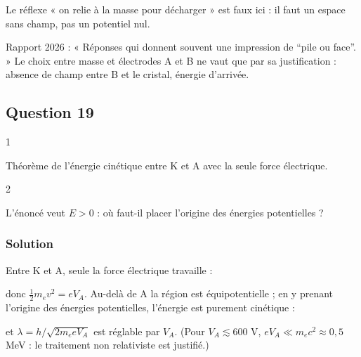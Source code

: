 \documentclass[11pt,a4paper]{article}
\newcommand{\equationajustee}[1]{%
  \sbox{\boiteequation}{$\displaystyle #1$}%
  \ifdim\wd\boiteequation>\linewidth
    \[\resizebox{\linewidth}{!}{\usebox{\boiteequation}}\]%
  \else
    \[#1\]%
  \fi}
\begin{document}
\begin{piege}

Le réflexe « on relie à la masse pour décharger » est faux ici : il faut un espace sans champ, pas un potentiel nul.

\end{piege}

\begin{jury}

Rapport 2026 : « Réponses qui donnent souvent une impression de ``pile ou face''. » Le choix entre masse et électrodes A et B ne vaut que par sa justification : absence de champ entre B et le cristal, énergie d'arrivée.

\end{jury}

\hypertarget{question-19}{%
\subsection{Question 19}\label{question-19}}

\begin{indication}{1}

Théorème de l'énergie cinétique entre K et A avec la seule force électrique.

\end{indication}

\begin{indication}{2}

L'énoncé veut \(E>0\) : où faut-il placer l'origine des énergies potentielles ?

\end{indication}

\hypertarget{solution-18}{%
\subsubsection{Solution}\label{solution-18}}

Entre K et A, seule la force électrique travaille :

\equationajustee{W=(-e)(0-V_A)=eV_A,}

donc \(\frac12m_ev^2=eV_A\). Au-delà de A la région est équipotentielle ; en y prenant l'origine des énergies potentielles, l'énergie est purement cinétique :

\equationajustee{\boxed{E=eV_A}}

\equationajustee{\boxed{p=\sqrt{2m_eeV_A}}}

et \(\lambda=h/\sqrt{2m_eeV_A}\) est réglable par \(V_A\). (Pour \(V_A\lesssim600\) V, \(eV_A\ll m_ec^2\approx0{,}5\) MeV : le traitement non relativiste est justifié.)
\end{document}
